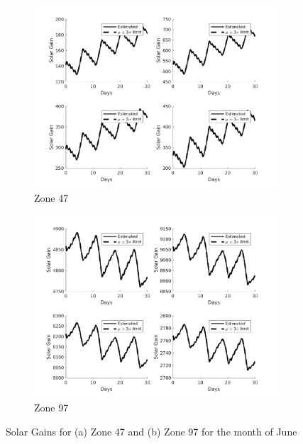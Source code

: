 \begin{figure}[H]
\begin{subfigure}{0.45\textwidth}
\centering
\includegraphics[width=\textwidth]{jbs_figures/solar_2_6}
\caption{Zone 47}
\label{solar_2_6}
\end{subfigure}
\centering
\begin{subfigure}{0.45\textwidth}
\includegraphics[width=\textwidth]{jbs_figures/solar_3_6}
\caption{Zone 97}
\label{solar_3_6}
\end{subfigure} 
\caption{Solar Gains for (a) Zone 47 and (b) Zone 97 for the month of June}
\label{Zone_solar_temperature_june}
\end{figure}


